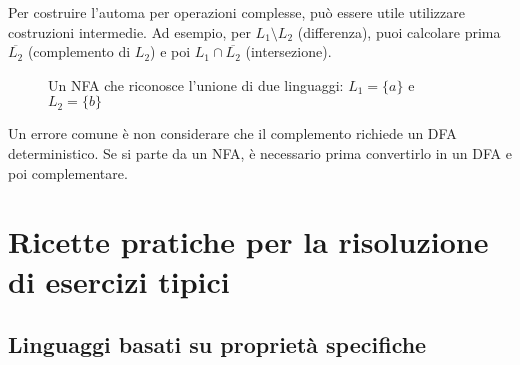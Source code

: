\documentclass[12pt,a4paper]{article}
\begin{document}
\begin{suggerimento}
Per costruire l'automa per operazioni complesse, può essere utile utilizzare costruzioni intermedie. Ad esempio, per $L_1 \setminus L_2$ (differenza), puoi calcolare prima $\overline{L_2}$ (complemento di $L_2$) e poi $L_1 \cap \overline{L_2}$ (intersezione).
\end{suggerimento}

\begin{figure}[h]
\centering
{}
\caption{Un NFA che riconosce l'unione di due linguaggi: $L_1 = \{a\}$ e $L_2 = \{b\}$}
\end{figure}

\begin{errorecomune}
Un errore comune è non considerare che il complemento richiede un DFA deterministico. Se si parte da un NFA, è necessario prima convertirlo in un DFA e poi complementare.
\end{errorecomune}

\section{Ricette pratiche per la risoluzione di esercizi tipici}

\subsection{Linguaggi basati su proprietà specifiche}
\end{document}
